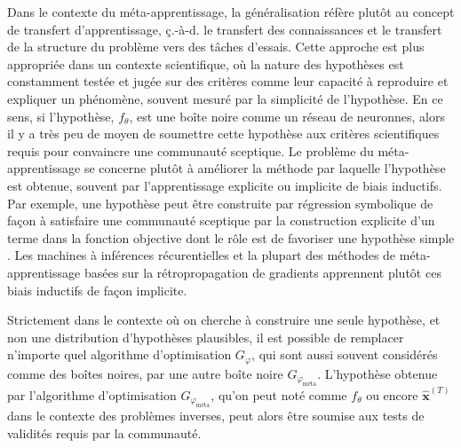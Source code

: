Dans le contexte du méta-apprentissage, la généralisation réfère plutôt au concept de transfert d'apprentissage, ç.-à-d. le transfert des connaissances 
et le transfert de la structure du problème vers des tâches d'essais. 
Cette approche est plus appropriée dans un contexte scientifique, où la nature des hypothèses est 
constamment testée et jugée sur des critères comme leur capacité à reproduire et expliquer un phénomène, souvent mesuré par 
la simplicité de l'hypothèse. En ce sens, 
si l'hypothèse, $f_\theta$, est une boîte noire comme un réseau de neuronnes, alors il y a très peu de moyen de soumettre 
cette hypothèse aux critères scientifiques requis pour convaincre une communauté sceptique. 
Le problème du méta-apprentissage se concerne plutôt à améliorer la méthode par laquelle l'hypothèse est obtenue, 
souvent par l'apprentissage explicite ou implicite de biais inductifs. 
Par exemple, une hypothèse peut être construite par régression symbolique 
de façon à satisfaire une communauté sceptique par la construction explicite 
d'un terme dans la fonction objective dont le rôle est de favoriser une hypothèse simple \citep[e.g.][]{Lemos2022}.
Les machines à inférences récurentielles et la plupart des méthodes de méta-apprentissage basées sur la 
rétropropagation de gradients \citep[e.g.][]{Finn2017} apprennent plutôt ces biais inductifs de façon implicite.

Strictement dans le contexte où on cherche à construire une seule hypothèse, et non une distribution d'hypothèses 
plausibles, il est possible de remplacer n'importe quel algorithme d'optimisation $G_\varphi$, qui sont aussi souvent considérés 
comme des boîtes noires, par une autre boîte noire $G_{\varphi_{\text{méta}}}$. L'hypothèse obtenue par 
l'algorithme d'optimisation $G_{\varphi_{\text{méta}}}$, qu'on peut noté comme $f_\theta$ ou encore $\hat{\mathbf{x}}^{(T)}$ 
dans le contexte des problèmes inverses, peut alors être soumise aux tests de validités 
requis par la communauté. 

